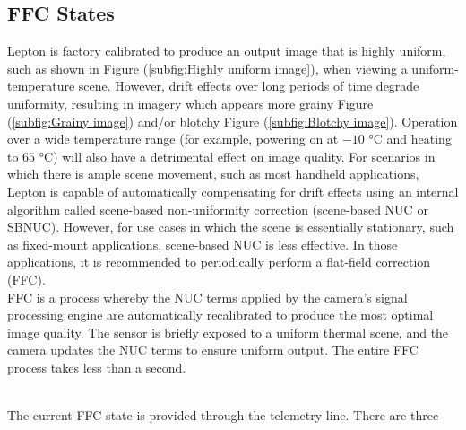 \subsection{FFC States}
\label{ssec:FFCstates}
Lepton is factory calibrated to produce an output image that is highly uniform,
such as shown in Figure (\ref{subfig:Highly uniform image}), when viewing a
uniform-temperature scene. However, drift effects over long periods of time
degrade uniformity, resulting in imagery which appears more grainy Figure
(\ref{subfig:Grainy image}) and/or blotchy Figure (\ref{subfig:Blotchy image}).
Operation over a wide temperature range (for example, powering on at $-10$
\si{\celsius} and heating to $65$ \si{\celsius}) will also have a detrimental
effect on image quality. For scenarios in which there is ample scene movement,
such as most handheld applications, Lepton is capable of automatically
compensating for drift effects using an internal algorithm called scene-based
non-uniformity correction (scene-based NUC or SBNUC). 
However, for use cases in which the scene is essentially stationary, such as 
fixed-mount applications, scene-based NUC is less effective. 
In those applications, it is recommended to periodically perform a flat-field 
correction (FFC).\\
FFC is a process whereby the NUC terms applied by the camera's signal 
processing engine are automatically recalibrated to produce the most optimal 
image quality. 
The sensor is briefly exposed to a uniform thermal scene, and the camera 
updates the NUC terms to ensure uniform output. 
The entire FFC process takes less than a second.
%
\begin{figure}[htb]
    \centering
     \quad
     \quad
    \label{fig:exampleffc}
\end{figure}
%
\\The current FFC state is provided through the telemetry line. There are three
